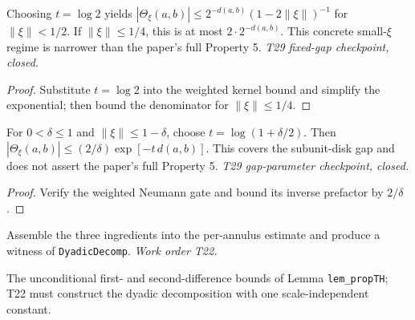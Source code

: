 \begin{lemma}
  \label{lem:combes-thomas-fixed-gap}
  \leanok
  Choosing $t=\log2$ yields
  $|\Theta_\xi(a,b)|\leq 2^{-d(a,b)}(1-2\|\xi\|)^{-1}$
  for $\|\xi\|<1/2$. If $\|\xi\|\leq1/4$, this is at most
  $2\cdot2^{-d(a,b)}$. This concrete small-$\xi$ regime is narrower
  than the paper's full Property 5.
  \emph{T29 fixed-gap checkpoint, closed.}
\end{lemma}
\begin{proof}\leanok
  Substitute $t=\log2$ into the weighted kernel bound and simplify
  the exponential; then bound the denominator for $\|\xi\|\leq1/4$.
\end{proof}

\begin{lemma}
  \label{lem:combes-thomas-gap-parameter}
  \leanok
  For $0<\delta\leq1$ and $\|\xi\|\leq1-\delta$, choose
  $t=\log(1+\delta/2)$. Then
  $|\Theta_\xi(a,b)|\leq
  (2/\delta)\exp[-t\,d(a,b)]$.
  This covers the subunit-disk gap and does not assert the paper's
  full Property 5.
  \emph{T29 gap-parameter checkpoint, closed.}
\end{lemma}
\begin{proof}\leanok
  Verify the weighted Neumann gate and bound its inverse prefactor
  by $2/\delta$.
\end{proof}

\begin{lemma}\label{lem:dyadic}
  Assemble the three ingredients into the per-annulus estimate and produce
  a witness of \texttt{DyadicDecomp}.
  \emph{Work order T22.}
\end{lemma}

\begin{lemma}\label{lem:propTH-6}
  The unconditional first- and second-difference bounds of Lemma
  \texttt{lem\_propTH}; T22 must construct the dyadic decomposition with one
  scale-independent constant.
\end{lemma}

